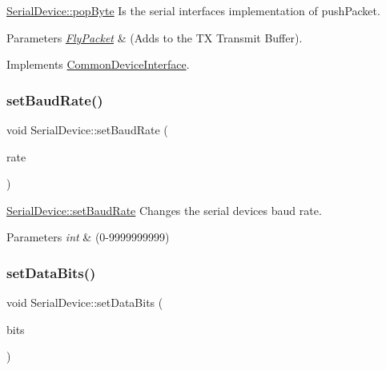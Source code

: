 \hyperlink{class_serial_device_aa48df17f28ab9f613ba07181487a39c9}{Serial\+Device\+::pop\+Byte} Is the serial interface\textquotesingle{}s implementation of push\+Packet. 


\begin{DoxyParams}{Parameters}
{\em \hyperlink{class_fly_packet}{Fly\+Packet}} & (Adds to the TX Transmit Buffer). \\
\hline
\end{DoxyParams}


Implements \hyperlink{class_common_device_interface_a682446d40e63ab7e6aa95dae7e0cd83b}{Common\+Device\+Interface}.

\hypertarget{class_serial_device_af06c6a34b54819e71186243a38606280}{}\label{class_serial_device_af06c6a34b54819e71186243a38606280} 
\subsubsection{\texorpdfstring{set\+Baud\+Rate()}{setBaudRate()}}
{\footnotesize\ttfamily void Serial\+Device\+::set\+Baud\+Rate (\begin{DoxyParamCaption}\item[{int}]{rate }\end{DoxyParamCaption})}



\hyperlink{class_serial_device_af06c6a34b54819e71186243a38606280}{Serial\+Device\+::set\+Baud\+Rate} Changes the serial device\textquotesingle{}s baud rate. 


\begin{DoxyParams}{Parameters}
{\em int} & (0-\/9999999999) \\
\hline
\end{DoxyParams}
\hypertarget{class_serial_device_ad0ddca3e77e1d1d4df7c68e83f1ecd91}{}\label{class_serial_device_ad0ddca3e77e1d1d4df7c68e83f1ecd91} 
\subsubsection{\texorpdfstring{set\+Data\+Bits()}{setDataBits()}}
{\footnotesize\ttfamily void Serial\+Device\+::set\+Data\+Bits (\begin{DoxyParamCaption}\item[{int}]{bits }\end{DoxyParamCaption})}




